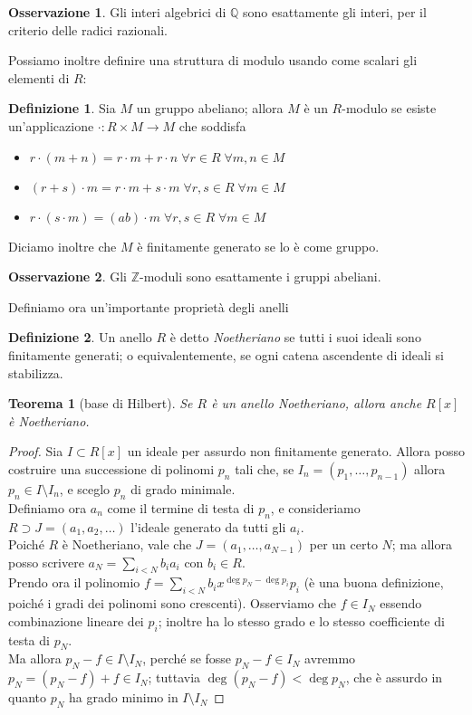 \documentclass[11pt]{article}
\theoremstyle{plain}
\newtheorem{thm}{Teorema}[section]
\theoremstyle{definition}
\newtheorem{defn}{Definizione}[section]
\newtheorem*{rem}{Osservazione}
\theoremstyle{remark}
\newcommand{\Q}{\mathbb{Q}}
\newcommand{\Z}{\mathbb{Z}}
\begin{document}
  \begin{rem}\label{int_alg_raz}
   Gli interi algebrici di $\Q$ sono esattamente gli interi, per il criterio delle radici razionali.
  \end{rem}
  Possiamo inoltre definire una struttura di modulo usando come scalari gli elementi di $R$:
  \begin{defn}
   Sia $M$ un gruppo abeliano; allora $M$ è un $R$-modulo se esiste un'applicazione $\cdot:R\times M\to M$ che soddisfa
   \begin{itemize}
    \item $r\cdot(m+n)=r\cdot m+r\cdot n\;\forall r\in R\;\forall m,n\in M$
    \item $(r+s)\cdot m=r\cdot m+s\cdot m\;\forall r,s\in R\;\forall m\in M$
    \item $r\cdot(s\cdot m)=(ab)\cdot m\;\forall r,s\in R\;\forall m\in M$
   \end{itemize}
   Diciamo inoltre che $M$ è finitamente generato se lo è come gruppo.
  \end{defn}
  \begin{rem}
   Gli $\Z$-moduli sono esattamente i gruppi abeliani.
  \end{rem}
  Definiamo ora un'importante proprietà degli anelli
  \begin{defn}
   Un anello $R$ è detto \textit{Noetheriano} se tutti i suoi ideali sono finitamente generati; o equivalentemente, se ogni catena ascendente di ideali si stabilizza.
  \end{defn}
  \begin{thm}[base di Hilbert]
   Se $R$ è un anello Noetheriano, allora anche $R[x]$ è Noetheriano.
  \end{thm}
  \begin{proof}
   Sia $I\subset R[x]$ un ideale per assurdo non finitamente generato. Allora posso costruire una successione di polinomi $p_n$ tali che, se $I_n=(p_1,\dots,p_{n-1})$ allora $p_n\in I\setminus I_n$, e sceglo $p_n$ di grado minimale.\\
   Definiamo ora $a_n$ come il termine di testa di $p_n$, e consideriamo $R\supset J=(a_1,a_2,\dots)$ l'ideale generato da tutti gli $a_i$.\\
   Poiché $R$ è Noetheriano, vale che $J=(a_1,\dots,a_{N-1})$ per un certo $N$; ma allora posso scrivere $a_N=\sum_{i<N}b_ia_i$ con $b_i\in R$.\\
   Prendo ora il polinomio $\displaystyle f=\sum_{i<N}b_i x^{\deg p_N -\deg p_i}p_i$ (è una buona definizione, poiché i gradi dei polinomi sono crescenti).
   Osserviamo che $f\in I_N$ essendo combinazione lineare dei $p_i$; inoltre ha lo stesso grado e lo stesso coefficiente di testa di $p_N$.\\
   Ma allora $p_N-f\in I\setminus I_N$, perché se fosse $p_N-f\in I_N$ avremmo $p_N=(p_N-f)+f\in I_N$; tuttavia $\deg (p_N-f)<\deg p_N$, che è assurdo in quanto $p_N$ ha grado minimo in $I\setminus I_N$
  \end{proof}
\end{document}
